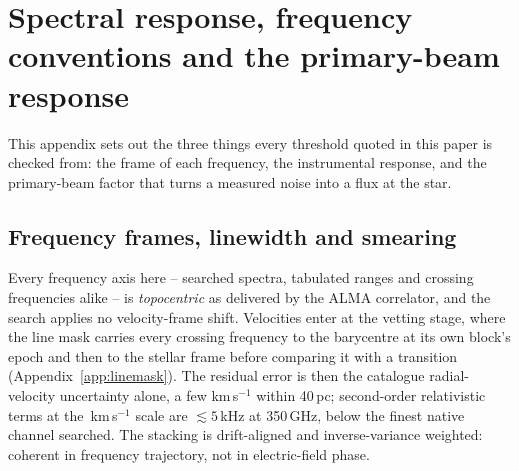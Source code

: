 \section{Spectral response, frequency conventions and the primary-beam
response}
\label{app:conventions}

This appendix sets out the three things every threshold quoted in this paper
is checked from: the frame of each frequency, the instrumental response, and
the primary-beam factor that turns a measured noise into a flux at the star.


\subsection{Frequency frames, linewidth and smearing}

Every frequency axis here -- searched spectra, tabulated ranges and
crossing frequencies alike -- is \emph{topocentric} as delivered by the
ALMA correlator, and the search applies no velocity-frame shift.
Velocities enter at the vetting stage, where the line mask carries every
crossing frequency to the barycentre at its own block's epoch and then to the
stellar frame before comparing it with a transition
(Appendix~\ref{app:linemask}). The residual error is then the catalogue
radial-velocity uncertainty alone, a few km\,s$^{-1}$ within 40\,pc;
second-order relativistic terms at the \MaskHalfKms\,km\,s$^{-1}$
scale are $\lesssim5$\,kHz at 350\,GHz, below the finest native channel
searched. The stacking is drift-aligned and inverse-variance weighted:
coherent in frequency trajectory, not in electric-field phase.

